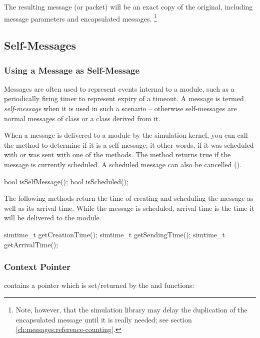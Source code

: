 The resulting message (or packet) will be an exact copy of the original,
including message parameters and encapsulated messages.
  \footnote{Note, however, that the simulation library may delay the
  duplication of the encapsulated message until it is really needed;
  see section \ref{ch:messages:reference-counting}.}


\subsection{Self-Messages}

\subsubsection{Using a Message as Self-Message}

Messages are often used to represent events internal to a module,
such as a periodically firing timer to represent expiry of a timeout.
A message is termed \textit{self-message} when it is used
in such a scenario -- otherwise self-messages are normal messages
of class  or a class derived from it.

When a message is delivered to a module by the simulation kernel,
you can call the  method to determine if it is
a self-message; it other words, if it was scheduled with
 or was sent with one of the
 methods. The  method
returns true if the message is currently scheduled. A scheduled
message can also be cancelled ().

\begin{cpp}
bool isSelfMessage();
bool isScheduled();
\end{cpp}

The following methods return the time of creating and scheduling the message
as well as its arrival time. While the message is scheduled, arrival
time is the time it will be delivered to the module.

\begin{cpp}
simtime_t getCreationTime();
simtime_t getSendingTime();
simtime_t getArrivalTime();
\end{cpp}

\subsubsection{Context Pointer}

 contains a  pointer which is
set/returned by the  and
 functions:

